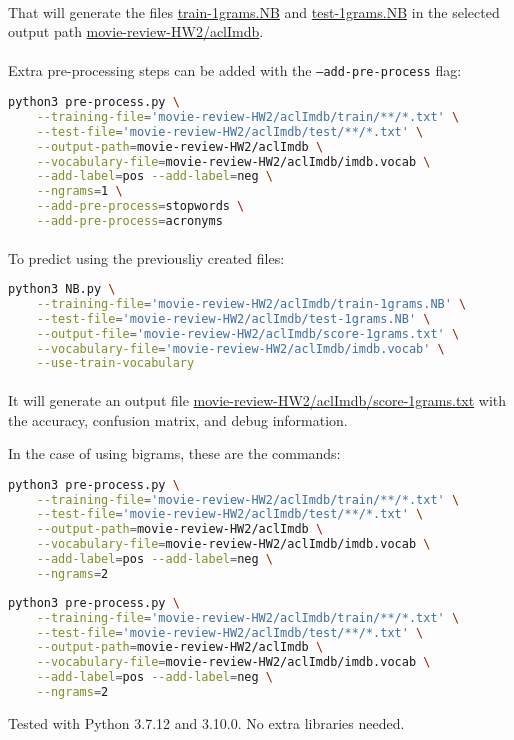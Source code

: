 \documentclass{article}
\begin{document}
\paragraph{} That will generate the files \url{train-1grams.NB} and \url{test-1grams.NB} in the selected output path \url{movie-review-HW2/aclImdb}.

\paragraph{} Extra pre-processing steps can be added with the \texttt{--add-pre-process} flag:

\begin{lstlisting}[language=bash]
    python3 pre-process.py \
    --training-file='movie-review-HW2/aclImdb/train/**/*.txt' \
    --test-file='movie-review-HW2/aclImdb/test/**/*.txt' \
    --output-path=movie-review-HW2/aclImdb \
    --vocabulary-file=movie-review-HW2/aclImdb/imdb.vocab \
    --add-label=pos --add-label=neg \
    --ngrams=1 \
    --add-pre-process=stopwords \
    --add-pre-process=acronyms
\end{lstlisting}

\paragraph{} To predict using the previousliy created files:

\begin{lstlisting}[language=bash]
python3 NB.py \
    --training-file='movie-review-HW2/aclImdb/train-1grams.NB' \
    --test-file='movie-review-HW2/aclImdb/test-1grams.NB' \
    --output-file='movie-review-HW2/aclImdb/score-1grams.txt' \
    --vocabulary-file='movie-review-HW2/aclImdb/imdb.vocab' \
    --use-train-vocabulary
\end{lstlisting}

\paragraph{} It will generate an output file \url{movie-review-HW2/aclImdb/score-1grams.txt} with the accuracy, confusion matrix, and debug information.

In the case of using bigrams, these are the commands:

\begin{lstlisting}[language=bash]
python3 pre-process.py \
    --training-file='movie-review-HW2/aclImdb/train/**/*.txt' \
    --test-file='movie-review-HW2/aclImdb/test/**/*.txt' \
    --output-path=movie-review-HW2/aclImdb \
    --vocabulary-file=movie-review-HW2/aclImdb/imdb.vocab \
    --add-label=pos --add-label=neg \
    --ngrams=2
\end{lstlisting}

\begin{lstlisting}[language=bash]
python3 pre-process.py \
    --training-file='movie-review-HW2/aclImdb/train/**/*.txt' \
    --test-file='movie-review-HW2/aclImdb/test/**/*.txt' \
    --output-path=movie-review-HW2/aclImdb \
    --vocabulary-file=movie-review-HW2/aclImdb/imdb.vocab \
    --add-label=pos --add-label=neg \
    --ngrams=2
\end{lstlisting}

Tested with Python 3.7.12 and 3.10.0\@. No extra libraries needed.
\end{document}
